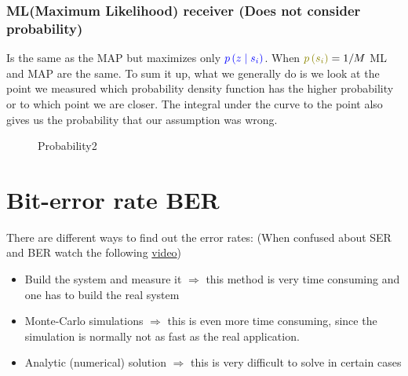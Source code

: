 \subsubsection{ML(Maximum Likelihood) receiver (Does not consider probability)} 
Is the same as the MAP but maximizes only $\textcolor{blue}{p\left(z \mid s_i\right)}$. When $\textcolor{olive}{p\left(s_i\right)}=1/M$ ML and MAP are the same. \newline
To sum it up, what we generally do is we look at the point we measured which probability density function has the higher probability or to which point we are closer. The integral under the curve to the point also gives us the probability that our assumption was wrong.
\begin{figure}[ht]
  \centering
  \caption{Probability2}
  \label{fig:probability_2}
\end{figure}
\section{Bit-error rate BER}
There are different ways to find out the error rates: (When confused about SER and BER watch the following  \href{https://youtu.be/du-sExIUV-Y}{video})
\begin{itemize}
\item Build the system and measure it $\Rightarrow$ this method is very time consuming and one has to build the real system
\item Monte-Carlo simulations $\Rightarrow$ this is even more time consuming, since the simulation is normally not as fast as the real application.
\item Analytic (numerical) solution $\Rightarrow$ this is very difficult to solve in certain cases
\end{itemize}

